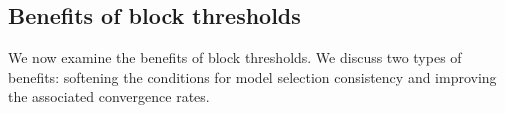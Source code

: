 \documentclass[bj,authoryear]{imsart}
\theoremstyle{plain}
\begin{document}
\subsection{Benefits of block thresholds}\label{sec:prosconsblock}

We now examine the benefits of block thresholds. We discuss
two types of benefits: softening the 
conditions for model selection consistency and improving the associated convergence rates. \smallskip

\end{document}
